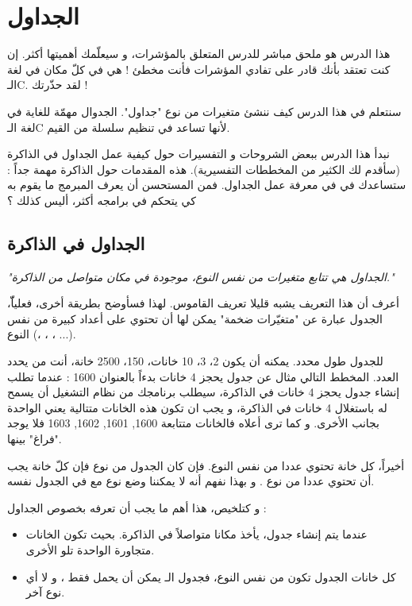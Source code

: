 \chapter{الجداول}
هذا الدرس هو ملحق مباشر للدرس المتعلق بالمؤشرات، و سيعلّمك أهميتها أكثر. إن كنت تعتقد بأنك قادر على تفادي المؤشرات فأنت مخطئ ! هي في كلّ مكان في لغة الـ\textenglish{C}. لقد حذّرتك !

سنتعلم في هذا الدرس كيف ننشئ متغيرات من نوع "جداول". الجدوال مهمّة للغاية في لغة الـ\textenglish{C} لأنها تساعد في تنظيم سلسلة من القيم.

نبدأ هذا الدرس ببعض الشروحات و التفسيرات حول كيفية عمل الجداول في الذاكرة (سأقدم لك الكثير من المخططات التفسيرية). هذه المقدمات حول الذاكرة مهمة جداً : ستساعدك في في معرفة عمل الجداول. فمن المستحسن أن يعرف المبرمج ما يقوم به كي يتحكم في برامجه أكثر، أليس كذلك ؟

\section{الجداول في الذاكرة}
\textit{"الجداول هي تتابع متغيرات من نفس النوع، موجودة في مكان متواصل من الذاكرة."}

أعرف أن هذا التعريف يشبه قليلا تعريف القاموس. لهذا فسأوضح بطريقة أخرى، فعلياّّ، الجدول عبارة عن "متغيّرات ضخمة" يمكن لها أن تحتوي على أعداد كبيرة من نفس النوع
(،
،
،
...).

للجدول طول محدد. يمكنه أن يكون 2، 3، 10 خانات، 150، 2500 خانة، أنت من يحدد العدد. المخطط التالي مثال عن جدول يحجز 4 خانات بدءاً بالعنوان 1600 :
عندما تطلب إنشاء جدول يحجز 4 خانات في الذاكرة، سيطلب برنامجك من نظام التشغيل أن يسمح له باستغلال 4 خانات في الذاكرة، و يجب ان تكون هذه الخانات متتالية يعني الواحدة بجانب الأخرى. و كما ترى أعلاه فالخانات متتابعة 1600, 1601, 1602, 1603 فلا يوجد "فراغ" بينها.

أخيراً، كل خانة تحتوي عددا من نفس النوع. فإن كان الجدول من نوع
فإن كلّ خانة يجب أن تحتوي عددا من نوع
.
و بهذا نفهم أنه لا يمكننا وضع نوع
مع
في الجدول نفسه.

و كتلخيص، هذا أهم ما يجب أن تعرفه بخصوص الجداول :
\begin{itemize}
  \item عندما يتم إنشاء جدول، يأخذ مكانا متواصلاً في الذاكرة. بحيث تكون الخانات متجاورة الواحدة تلو الأخرى.
  \item كل خانات الجدول تكون من نفس النوع، فجدول
الـ
يمكن أن يحمل فقط
،
و لا أي نوع آخر.
\end{itemize}

